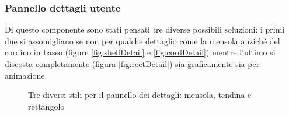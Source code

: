 \subsubsection{Pannello dettagli utente}
Di questo componente sono stati pensati tre diverse possibili soluzioni: i primi due si assomigliano se non per qualche dettaglio come la mensola anziché del cordino in basso (figure \ref{fig:shelfDetail} e \ref{fig:cordDetail}) mentre l'ultimo si discosta completamente (figura \ref{fig:rectDetail}) sia graficamente sia per animazione.
\begin{figure} [h]
    \centering
    \caption{Tre diversi stili per il pannello dei dettagli: mensola, tendina e rettangolo}
    \label{fig:detailBanner}
\end{figure}
%
